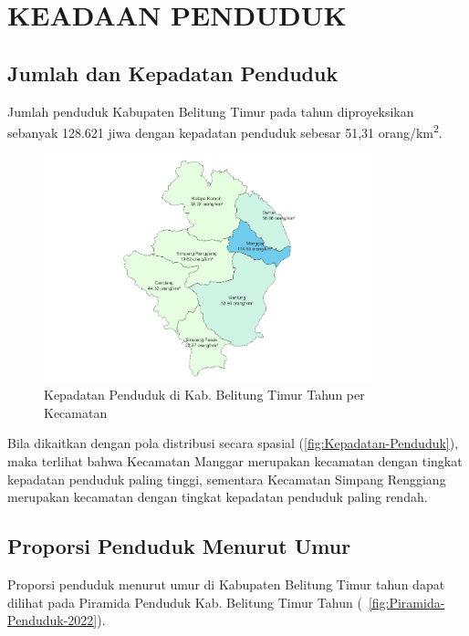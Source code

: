 \section{KEADAAN PENDUDUK}
\subsection{Jumlah dan Kepadatan Penduduk}
Jumlah penduduk Kabupaten Belitung Timur pada tahun \tP diproyeksikan sebanyak
128.621 jiwa dengan kepadatan penduduk sebesar 51,31 orang/km\textsuperscript{2}.

\begin{figure}[H]
	\centering
	\includegraphics[width=0.85\textwidth]{bab_01/bab_01_01_kepadatanPenduduk}
	\caption{Kepadatan Penduduk di Kab. Belitung Timur Tahun \tP per Kecamatan}
	\label{fig:Kepadatan-Penduduk}
\end{figure}

Bila dikaitkan dengan pola distribusi secara spasial (\autoref{fig:Kepadatan-Penduduk}), maka terlihat
bahwa Kecamatan Manggar merupakan kecamatan dengan tingkat kepadatan
penduduk paling tinggi, sementara Kecamatan Simpang Renggiang merupakan
kecamatan dengan tingkat kepadatan penduduk paling rendah.

\subsection{Proporsi Penduduk Menurut Umur}
Proporsi penduduk menurut umur di Kabupaten Belitung Timur tahun
\tP dapat dilihat pada Piramida Penduduk Kab. Belitung Timur Tahun \tP (~\autoref{fig:Piramida-Penduduk-2022}).

